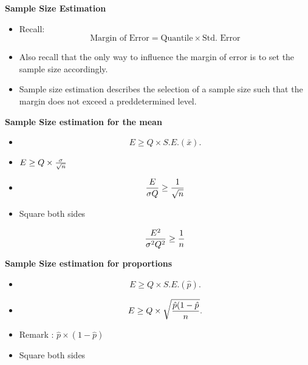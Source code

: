 
\textbf{Sample Size Estimation}

\begin{itemize} \item Recall:
\[  \mbox{Margin of Error}  = \mbox{Quantile} \times \mbox{Std. Error}\]

\item Also recall that the only way to influence the margin of error is to set the sample size accordingly.

\item Sample size estimation describes the selection of a sample size such that the margin does not exceed a preddetermined level.
\end{itemize}



\textbf{Sample Size estimation for the mean}

\begin{itemize}
\item \[ E \geq Q \times S.E.(\bar{x}). \]

\item 
$E \geq Q \times {\sigma \over \sqrt{n} }$

\item
\[ \frac{E}{\sigma Q} \geq {1 \over \sqrt{n} } \]

\item Square both sides


\[ \frac{E^2}{\sigma^2 Q^2} \geq {1 \over n } \]


\end{itemize}



\textbf{Sample Size estimation for proportions}

\begin{itemize}
\item \[ E \geq Q \times S.E.(\hat{p}). \]

\item 
\[ E \geq Q \times \sqrt{{\hat{p}(1-\hat{p} \over n}}. \]

\item Remark : $\hat{p} \times (1-\hat{p})$

\item Square both sides



\end{itemize}



